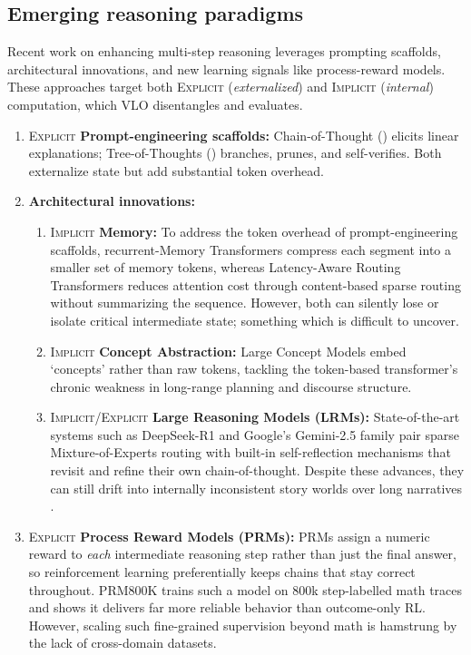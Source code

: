 \documentclass{article}
\begin{document}
\subsection{Emerging reasoning paradigms}
\label{subsec:advanced-reasoning}
Recent work on enhancing multi-step reasoning leverages prompting scaffolds, architectural innovations, and new learning signals like process-reward models. These approaches target both \textsc{Explicit} (\emph{externalized}) and \textsc{Implicit} (\emph{internal}) computation, which VLO disentangles and evaluates.

\begin{enumerate}
  \item \textsc{Explicit} \textbf{Prompt-engineering scaffolds:}
        Chain-of-Thought (\citeyear{chain-of-thought}) elicits linear explanations; Tree-of-Thoughts (\citeyear{treeofthoughts}) branches, prunes, and self-verifies. Both externalize state but add substantial token overhead.

  \item \textbf{Architectural innovations:}
        \begin{enumerate}
          \item \textsc{Implicit} \textbf{Memory:} To address the token overhead of prompt-engineering scaffolds, recurrent-Memory Transformers \citep{rmt} compress each segment into a smaller set of memory tokens, whereas Latency-Aware Routing Transformers \citep{latencyawarerouting} reduces attention cost through content-based sparse routing without summarizing the sequence. However, both can silently lose or isolate critical intermediate state; something which is difficult to uncover.
          \item \textsc{Implicit} \textbf{Concept Abstraction:} Large Concept Models \citep{lcm} embed `concepts' rather than raw tokens, tackling the token-based transformer's chronic weakness in long-range planning and discourse structure.
          \item \textsc{Implicit/Explicit} \textbf{Large Reasoning Models (LRMs):} State-of-the-art systems such as DeepSeek-R1 \citep{DeepSeekR1} and Google's Gemini-2.5 family \citep{gemini_25_blog} pair sparse Mixture-of-Experts routing with built-in self-reflection mechanisms that revisit and refine their own chain-of-thought. Despite these advances, they can still drift into internally inconsistent story worlds over long narratives \citep{flawedfictions, lost-in-middle}.
        \end{enumerate}
  \item \textsc{Explicit} \textbf{Process Reward Models (PRMs):}
        PRMs assign a numeric reward to \emph{each} intermediate reasoning step rather than just the final answer, so reinforcement learning preferentially keeps chains that stay correct throughout.  PRM800K \citep{PRM800K_paper} trains such a model on 800k step-labelled math traces and shows it delivers far more reliable behavior than outcome-only RL. However, scaling such fine-grained supervision beyond math is hamstrung by the lack of cross-domain datasets.
\end{enumerate}
\end{document}
